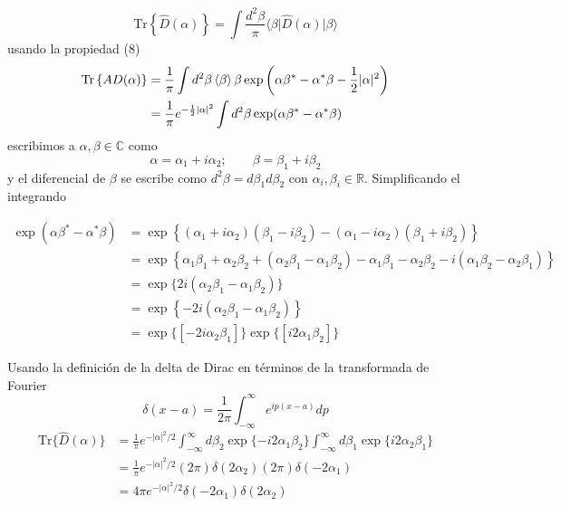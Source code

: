 \begin{enumerate}
\begin{equation*}
\mathrm{Tr}\left\{\hat{D}(\alpha) \right\} = \int \frac{d^2\beta}{\pi}\langle \beta \vert \hat{D}(\alpha) \vert \beta \rangle
\end{equation*}
usando la propiedad (8)
\begin{align*}
\mathrm{Tr}\left\{ A{D}(\alpha) \right\} & = \frac{1}{\pi}\int d^2\beta \braket{\beta}{\beta}\exp{\left( \alpha\beta^* - \alpha^*\beta - \frac{1}{2}|\alpha|^2 \right)} \\
& = \frac{1}{\pi}e^{-\frac{1}{2}|\alpha|^2} \int d^2\beta \exp(\alpha\beta^* - \alpha^*\beta)
\end{align*}
escribimos a $\alpha,\beta \in \mathbb{C} $ como
\begin{equation*}
\alpha = \alpha_1 + i\alpha_2;\qquad \beta = \beta_1 + i\beta_2
\end{equation*}
y el diferencial de $\beta$ se escribe como $d^2\beta = d\beta_1 d\beta_2$ con $\alpha_i, \beta_i \in \mathbb{R}$. Simplificando el integrando

\begin{align*}
\exp(\alpha\beta^* - \alpha^*\beta) & = \exp\left\{ (\alpha_1 + i\alpha_2)(\beta_1 - i\beta_2) - (\alpha_1 - i\alpha_2)(\beta_1 + i\beta_2) \right\}\\
& = \exp\left\{\alpha_1\beta_1 + \alpha_2\beta_2 + (\alpha_2\beta_1 - \alpha_1\beta_2) - \alpha_1\beta_1 - \alpha_2\beta_2 - i(\alpha_1\beta_2 - \alpha_2\beta_1)\right\} \\
& = \exp\{ 2i(\alpha_2\beta_1 - \alpha_1\beta_2) \}   \\
& = \exp\left\{ -2i(\alpha_{2}\beta_{1} - \alpha_{1}\beta_{2}) \right\} \\
& = \exp\{[-2i\alpha_2\beta_1]\}\exp\{[i2\alpha_1\beta_2]\}
\end{align*}



Usando la definición de la delta de Dirac en términos de la transformada de Fourier
\begin{equation*}
\delta(x-a) = \frac{1}{2\pi} \int_{-\infty}^{\infty}e^{ip(x-a)}dp
\end{equation*}
\begin{align*}
\mathrm{Tr}\{\hat{D}(\alpha)\} & = \frac{1}{\pi}e^{-|\alpha|^2/2}\int_{-\infty}^{\infty}d\beta_2 \exp{\{-i2\alpha_1\beta_2\}}\int_{-\infty}^{\infty}d\beta_1 \exp{\{i2\alpha_2\beta_1\}} \\
& = \frac{1}{\pi} e^{-|\alpha|^2/2}(2\pi)\delta(2\alpha_2)(2\pi)\delta(-2\alpha_1)       \\
& = 4\pi e^{-|\alpha|^2/2} \delta(-2\alpha_1)\delta(2\alpha_2)
\end{align*}



\end{enumerate}
